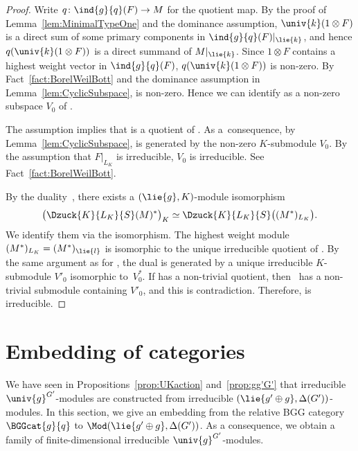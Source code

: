 \begin{proof}
	Write $q\colon \ind{g}{q}(F)\rightarrow M$ for the quotient map.
	By the proof of Lemma~\ref{lem:MinimalTypeOne} and the dominance assumption, $\univ{k}(1\otimes F)$ is a direct sum of some primary components in $\ind{g}{q}(F)|_{\lie{k}}$, and hence $q(\univ{k}(1\otimes F))$ is a direct summand of $M|_{\lie{k}}$.
	Since $1\otimes F$ contains a highest weight vector in $\ind{g}{q}(F)$, $q(\univ{k}(1\otimes F))$ is non-zero.
	By Fact~\ref{fact:BorelWeilBott} and the dominance assumption in Lemma~\ref{lem:CyclicSubspace},  is non-zero.
	Hence we can identify  as a non-zero subspace $V_0$ of .

	The assumption  implies that  is a quotient of .
As a~consequence, by Lemma~\ref{lem:CyclicSubspace},  is generated by the non-zero $K$-submodule $V_0$.
	By the assumption that $F|_{L_K}$ is irreducible, $V_0$ is irreducible.
	See Fact~\ref{fact:BorelWeilBott}.

	By the duality~\cite[Corollary~3.7]{KnVo95_cohomological_induction}, there exists a $(\lie{g}, K)$-module isomorphism
 \[
 \bigl(\Dzuck{K}{L_K}{S}(M)^*\bigr)_K\simeq \Dzuck{K}{L_K}{S}\bigl((M^*)_{L_K}\bigr).
 \]
	We identify them via the isomorphism.
	The highest weight module $(M^*)_{L_K} = (M^*)_{\lie{l}}$ is isomorphic to the unique irreducible quotient of .
	By the same argument as for , the dual  is generated by a unique irreducible $K$-submodule $V'_0$ isomorphic to~$V_0^*$.
	If  has a non-trivial quotient, then~ has a non-trivial \mbox{submodule} \mbox{containing} $V'_0$, and this is contradiction.
	Therefore,  is irreducible.
\end{proof}



\section{Embedding of categories}\label{sect:Embedding}

We have seen in Propositions~\ref{prop:UKaction} and~\ref{prop:gg'G'} that irreducible $\univ{g}^{G'}$-modules are constructed from irreducible $(\lie{g'\oplus g}, \Delta(G'))$-modules.
In this section, we give an embedding from the relative BGG category $\BGGcat{g}{q}$ to $\Mod(\lie{g'\oplus g}, \Delta(G'))$.
As a consequence, we obtain a family of finite-dimensional irreducible $\univ{g}^{G'}$-modules.

